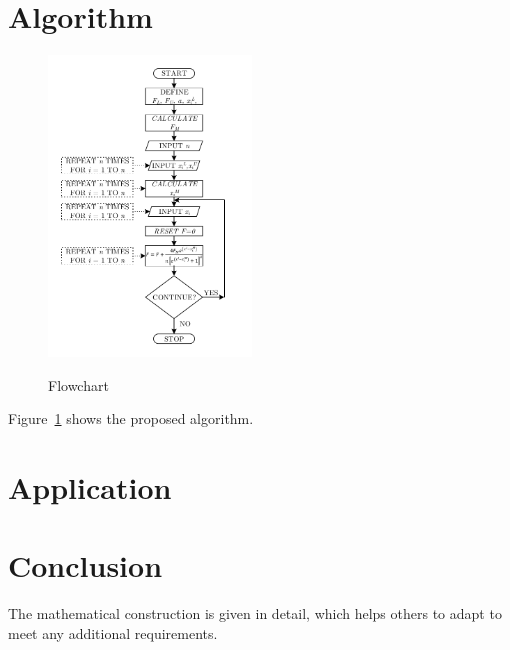 \documentclass[twocolumn]{svjour3}          %
\begin{document}
\section{Algorithm}
\label{Sec:Algorithm}
\begin{figure}
	\centering
	\includegraphics[width=0.48\textwidth]{images/flow-chart}
	\label{Fig:Flowchart}
	\caption{Flowchart}
\end{figure}
Figure~\ref{Fig:Flowchart} shows the proposed algorithm.
\section{Application}
\label{Sec:Application}
\section{Conclusion}
\label{Sec:Conclusion}
The mathematical construction is given in detail, which helps others to adapt to meet any additional requirements.



\end{document}
